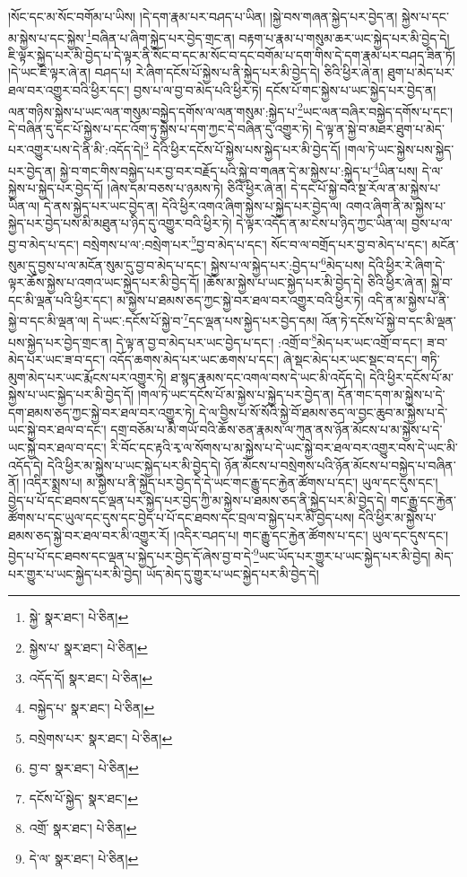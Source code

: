 །སོང་དང་མ་སོང་བགོམ་པ་ཡིས། །དེ་དག་རྣམ་པར་བཤད་པ་ཡིན། །སྐྱེ་བས་གཞན་སྐྱེད་པར་བྱེད་ན། སྐྱེས་པ་དང་མ་སྐྱེས་པ་དང་སྐྱེས་\footnote{སྐྱེ་  སྣར་ཐང་།  པེ་ཅིན། }བཞིན་པ་ཞིག་སྐྱེད་པར་བྱེད་གྲང་ན། བརྟག་པ་རྣམ་པ་གསུམ་ཆར་ཡང་སྐྱེད་པར་མི་བྱེད་དེ། ཇི་ལྟར་སྐྱེད་པར་མི་བྱེད་པ་དེ་ལྟར་ནི་སོང་བ་དང་མ་སོང་བ་དང་བགོམ་པ་དག་གིས་དེ་དག་རྣམ་པར་བཤད་ཟིན་ཏོ། །དེ་ཡང་ཇི་ལྟར་ཞེ་ན། བཤད་པ། རེ་ཞིག་དངོས་པོ་སྐྱེས་པ་ནི་སྐྱེད་པར་མི་བྱེད་དེ། ཅིའི་ཕྱིར་ཞེ་ན། ཐུག་པ་མེད་པར་ཐལ་བར་འགྱུར་བའི་ཕྱིར་དང་། བྱས་པ་ལ་བྱ་བ་མེད་པའི་ཕྱིར་ཏེ། དངོས་པོ་གང་སྐྱེས་པ་ཡང་སྐྱེད་པར་བྱེད་ན། ལན་གཉིས་སྐྱེས་པ་ཡང་ལན་གསུམ་བསྐྱེད་དགོས་ལ་ལན་གསུམ་:སྐྱེད་པ་\footnote{སྐྱེས་པ་  སྣར་ཐང་།  པེ་ཅིན། }ཡང་ལན་བཞིར་བསྐྱེད་དགོས་པ་དང་། དེ་བཞིན་དུ་དང་པོ་སྐྱེས་པ་དང་འོག་ཏུ་སྐྱེས་པ་དག་ཀྱང་དེ་བཞིན་དུ་འགྱུར་ཏེ། དེ་ལྟ་ན་སྐྱེ་བ་མཐར་ཐུག་པ་མེད་པར་འགྱུར་པས་དེ་ནི་མི་:འདོད་དེ།\footnote{འདོད་དོ།  སྣར་ཐང་།  པེ་ཅིན། } དེའི་ཕྱིར་དངོས་པོ་སྐྱེས་པས་སྐྱེད་པར་མི་བྱེད་དོ། །གལ་ཏེ་ཡང་སྐྱེས་པས་སྐྱེད་པར་བྱེད་ན། སྐྱེ་བ་གང་གིས་བསྐྱེད་པར་བྱ་བར་བརྗོད་པའི་སྐྱེ་བ་གཞན་དེ་མ་སྐྱེས་པ་:སྐྱེད་པ་\footnote{བསྐྱེད་པ་  སྣར་ཐང་།  པེ་ཅིན། }ཡིན་པས། དེ་ལ་སྐྱེས་པ་སྐྱེད་པར་བྱེད་དོ། །ཞེས་དམ་བཅས་པ་ཉམས་ཏེ། ཅིའི་ཕྱིར་ཞེ་ན། དེ་དང་པོ་སྐྱེ་བའི་སྔ་རོལ་ན་མ་སྐྱེས་པ་ཡིན་ལ། དེ་ནས་སྐྱེད་པར་ཡང་བྱེད་ན། དེའི་ཕྱིར་འགའ་ཞིག་སྐྱེས་པ་སྐྱེད་པར་བྱེད་ལ། འགའ་ཞིག་ནི་མ་སྐྱེས་པ་སྐྱེད་པར་བྱེད་པས་མི་མཐུན་པ་ཉིད་དུ་འགྱུར་བའི་ཕྱིར་ཏེ། དེ་ལྟར་འདོད་ན་མ་ངེས་པ་ཉིད་ཀྱང་ཡིན་ལ། བྱས་པ་ལ་བྱ་བ་མེད་པ་དང་། བསྲེགས་པ་ལ་:བསྲེག་པར་\footnote{བསྲེགས་པར་  སྣར་ཐང་།  པེ་ཅིན། }བྱ་བ་མེད་པ་དང་། སོང་བ་ལ་བགྲོད་པར་བྱ་བ་མེད་པ་དང་། མངོན་སུམ་དུ་བྱས་པ་ལ་མངོན་སུམ་དུ་བྱ་བ་མེད་པ་དང་། སྐྱེས་པ་ལ་སྐྱེད་པར་:བྱེད་པ་\footnote{བྱ་བ་  སྣར་ཐང་།  པེ་ཅིན། }མེད་པས། དེའི་ཕྱིར་རེ་ཞིག་དེ་ལྟར་ཆོས་སྐྱེས་པ་འགའ་ཡང་སྐྱེད་པར་མི་བྱེད་དོ། །ཆོས་མ་སྐྱེས་པ་ཡང་སྐྱེད་པར་མི་བྱེད་དེ། ཅིའི་ཕྱིར་ཞེ་ན། སྐྱེ་བ་དང་མི་ལྡན་པའི་ཕྱིར་དང་། མ་སྐྱེས་པ་ཐམས་ཅད་ཀྱང་སྐྱེ་བར་ཐལ་བར་འགྱུར་བའི་ཕྱིར་ཏེ། འདི་ན་མ་སྐྱེས་པ་ནི་སྐྱེ་བ་དང་མི་ལྡན་ལ། དེ་ཡང་:དངོས་པོ་སྐྱེ་བ་\footnote{དངོས་པོ་སྐྱེད་  སྣར་ཐང་། }དང་ལྡན་པས་སྐྱེད་པར་བྱེད་དམ། འོན་ཏེ་དངོས་པོ་སྐྱེ་བ་དང་མི་ལྡན་པས་སྐྱེད་པར་བྱེད་གྲང་ན། དེ་ལྟ་ན་བྱ་བ་མེད་པར་ཡང་བྱེད་པ་དང་། :འགྲོ་བ་\footnote{འགྲོ་  སྣར་ཐང་།  པེ་ཅིན། }མེད་པར་ཡང་འགྲོ་བ་དང་། ཟ་བ་མེད་པར་ཡང་ཟ་བ་དང་། འདོད་ཆགས་མེད་པར་ཡང་ཆགས་པ་དང་། ཞེ་སྡང་མེད་པར་ཡང་སྡང་བ་དང་། གཏི་མུག་མེད་པར་ཡང་རྨོངས་པར་འགྱུར་ཏེ། ཐ་སྙད་རྣམས་དང་འགལ་བས་དེ་ཡང་མི་འདོད་དེ། དེའི་ཕྱིར་དངོས་པོ་མ་སྐྱེས་པ་ཡང་སྐྱེད་པར་མི་བྱེད་དོ། །གལ་ཏེ་ཡང་དངོས་པོ་མ་སྐྱེས་པ་སྐྱེད་པར་བྱེད་ན། དོན་གང་དག་མ་སྐྱེས་པ་དེ་དག་ཐམས་ཅད་ཀྱང་སྐྱེ་བར་ཐལ་བར་འགྱུར་ཏེ། དེ་ལ་བྱིས་པ་སོ་སོའི་སྐྱེ་བོ་ཐམས་ཅད་ལ་བྱང་ཆུབ་མ་སྐྱེས་པ་དེ་ཡང་སྐྱེ་བར་ཐལ་བ་དང་། དགྲ་བཅོམ་པ་མི་གཡོ་བའི་ཆོས་ཅན་རྣམས་ལ་ཀུན་ནས་ཉོན་མོངས་པ་མ་སྐྱེས་པ་དེ་ཡང་སྐྱེ་བར་ཐལ་བ་དང་། རི་བོང་དང་རྟའི་རྭ་ལ་སོགས་པ་མ་སྐྱེས་པ་དེ་ཡང་སྐྱེ་བར་ཐལ་བར་འགྱུར་བས་དེ་ཡང་མི་འདོད་དེ། དེའི་ཕྱིར་མ་སྐྱེས་པ་ཡང་སྐྱེད་པར་མི་བྱེད་དེ། ཉོན་མོངས་པ་བསྲེགས་པའི་ཉོན་མོངས་པ་བསྐྱེད་པ་བཞིན་ནོ། །འདིར་སྨྲས་པ། མ་སྐྱེས་པ་ནི་སྐྱེད་པར་བྱེད་དེ་དེ་ཡང་གང་རྒྱུ་དང་རྐྱེན་ཚོགས་པ་དང་། ཡུལ་དང་དུས་དང་། བྱེད་པ་པོ་དང་ཐབས་དང་ལྡན་པར་སྐྱེད་པར་བྱེད་ཀྱི་མ་སྐྱེས་པ་ཐམས་ཅད་ནི་སྐྱེད་པར་མི་བྱེད་དེ། གང་རྒྱུ་དང་རྐྱེན་ཚོགས་པ་དང་ཡུལ་དང་དུས་དང་བྱེད་པ་པོ་དང་ཐབས་དང་བྲལ་བ་སྐྱེད་པར་མི་བྱེད་པས། དེའི་ཕྱིར་མ་སྐྱེས་པ་ཐམས་ཅད་སྐྱེ་བར་ཐལ་བར་མི་འགྱུར་རོ། །འདིར་བཤད་པ། གང་རྒྱུ་དང་རྐྱེན་ཚོགས་པ་དང་། ཡུལ་དང་དུས་དང་། བྱེད་པ་པོ་དང་ཐབས་དང་ལྡན་པ་སྐྱེད་པར་བྱེད་དོ་ཞེས་བྱ་བ་དེ་\footnote{དེ་ལ་  སྣར་ཐང་།  པེ་ཅིན། }ཡང་ཡོད་པར་གྱུར་པ་ཡང་སྐྱེད་པར་མི་བྱེད། མེད་པར་གྱུར་པ་ཡང་སྐྱེད་པར་མི་བྱེད། ཡོད་མེད་དུ་གྱུར་པ་ཡང་སྐྱེད་པར་མི་བྱེད་དེ། 